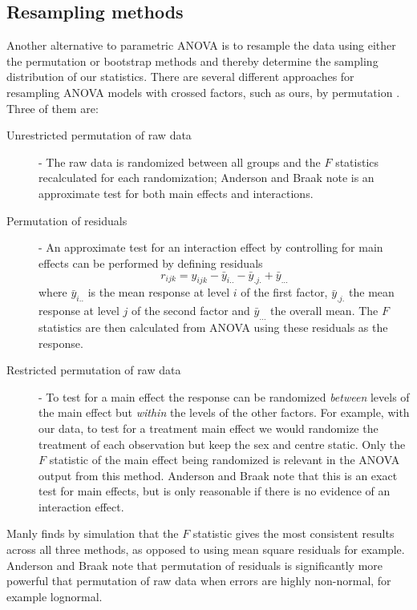 \subsection{Resampling methods}\label{section:resampling}
Another alternative to parametric ANOVA is to resample the data using either the permutation or bootstrap methods \cite{manly} and thereby determine the sampling distribution of our statistics. There are several different approaches for resampling ANOVA models with crossed factors, such as ours, by permutation \cite{manly, anderson}. Three of them are:
\begin{description}
\item[Unrestricted permutation of raw data] - The raw data is randomized between all groups and the $F$ statistics recalculated for each randomization; Anderson and Braak \cite{anderson} note is an approximate test for both main effects and interactions.
\item[Permutation of residuals] - An approximate test for an interaction effect by controlling for main effects can be performed by defining residuals
$$r_{ijk}=y_{ijk}-\bar{y}_{i..}-\bar{y}_{.j.}+\bar{y}_{...}$$
where $\bar{y}_{i..}$ is the mean response at level $i$ of the first factor, $\bar{y}_{.j.}$ the mean response at level $j$ of the second factor and $\bar{y}_{...}$ the overall mean. The $F$ statistics are then calculated from ANOVA using these residuals as the response.
\item[Restricted permutation of raw data] - To test for a main effect the response can be randomized \emph{between} levels of the main effect but \emph{within} the levels of the other factors. For example, with our data, to test for a treatment main effect we would randomize the treatment of each observation but keep the sex and centre static. Only the $F$ statistic of the main effect being randomized is relevant in the ANOVA output from this method. Anderson and Braak \cite{anderson} note that this is an exact test for main effects, but is only reasonable if there is no evidence of an interaction effect.
\end{description}
Manly \cite{manly} finds by simulation that the $F$ statistic gives the most consistent results across all three methods, as opposed to using mean square residuals for example. Anderson and Braak \cite{anderson} note that permutation of residuals is significantly more powerful that permutation of raw data when errors are highly non-normal, for example lognormal.

